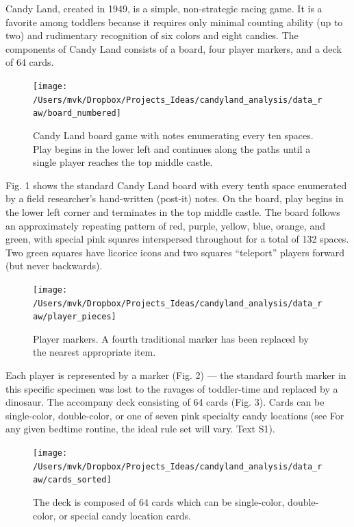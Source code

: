\documentclass[letterpaper,9pt,twocolumn,twoside,]{pinp}
\begin{document}
Candy Land, created in 1949, is a simple, non-strategic racing game. It
is a favorite among toddlers because it requires only minimal counting
ability (up to two) and rudimentary recognition of six colors and eight
candies. The components of Candy Land consists of a board, four player
markers, and a deck of 64 cards.

\begin{figure}

{\centering \texttt{[image: /Users/mvk/Dropbox/Projects\_Ideas/candyland\_analysis/data\_raw/board\_numbered]} 

}

\caption{Candy Land board game with notes enumerating every ten spaces. Play begins in the lower left and continues along the paths until a single player reaches the top middle castle.}\label{fig:unnamed-chunk-3}
\end{figure}

Fig. 1 shows the standard Candy Land board with every tenth space
enumerated by a field researcher's hand-written (post-it) notes. On the
board, play begins in the lower left corner and terminates in the top
middle castle. The board follows an approximately repeating pattern of
red, purple, yellow, blue, orange, and green, with special pink squares
interspersed throughout for a total of 132 spaces. Two green squares
have licorice icons and two squares ``teleport'' players forward (but
never backwards).

\begin{figure}

{\centering \texttt{[image: /Users/mvk/Dropbox/Projects\_Ideas/candyland\_analysis/data\_raw/player\_pieces]} 

}

\caption{Player markers. A fourth traditional marker has been replaced by the nearest appropriate item.}\label{fig:unnamed-chunk-4}
\end{figure}

Each player is represented by a marker (Fig. 2) --- the standard fourth
marker in this specific specimen was lost to the ravages of toddler-time
and replaced by a dinosaur. The accompany deck consisting of 64 cards
(Fig. 3). Cards can be single-color, double-color, or one of seven pink
specialty candy locations (see For any given bedtime routine, the ideal
rule set will vary. Text S1).

\begin{figure}

{\centering \texttt{[image: /Users/mvk/Dropbox/Projects\_Ideas/candyland\_analysis/data\_raw/cards\_sorted]} 

}

\caption{The deck is composed of 64 cards which can be single-color, double-color, or special candy location cards.}\label{fig:unnamed-chunk-5}
\end{figure}
\end{document}
